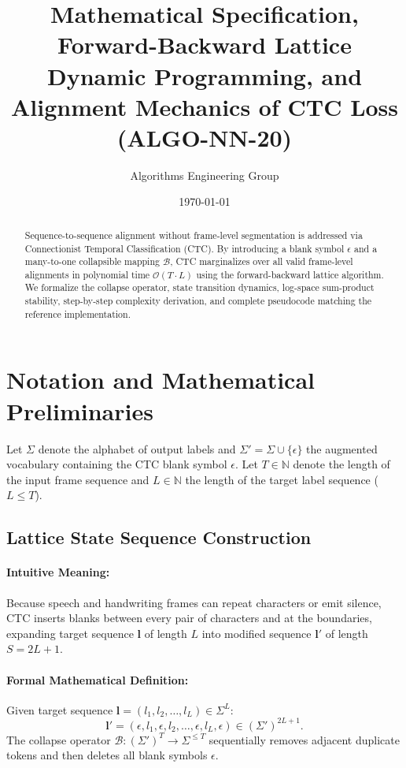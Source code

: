 \documentclass[11pt]{article}
\title{\textbf{Mathematical Specification, Forward-Backward Lattice Dynamic Programming, and Alignment Mechanics of CTC Loss (ALGO-NN-20)}}
\author{Algorithms Engineering Group}
\date{\today}
\begin{document}
\maketitle

\begin{abstract}
Sequence-to-sequence alignment without frame-level segmentation is addressed via Connectionist Temporal Classification (CTC). By introducing a blank symbol $\epsilon$ and a many-to-one collapsible mapping $\mathcal{B}$, CTC marginalizes over all valid frame-level alignments in polynomial time $\mathcal{O}(T \cdot L)$ using the forward-backward lattice algorithm. We formalize the collapse operator, state transition dynamics, log-space sum-product stability, step-by-step complexity derivation, and complete pseudocode matching the reference implementation.
\end{abstract}

\section{Notation and Mathematical Preliminaries}
\label{sec:notation}

Let $\Sigma$ denote the alphabet of output labels and $\Sigma' = \Sigma \cup \{\epsilon\}$ the augmented vocabulary containing the CTC blank symbol $\epsilon$. Let $T \in \mathbb{N}$ denote the length of the input frame sequence and $L \in \mathbb{N}$ the length of the target label sequence ($L \le T$).

\subsection{Lattice State Sequence Construction}
\paragraph{Intuitive Meaning:} Because speech and handwriting frames can repeat characters or emit silence, CTC inserts blanks between every pair of characters and at the boundaries, expanding target sequence $\mathbf{l}$ of length $L$ into modified sequence $\mathbf{l}'$ of length $S = 2L + 1$.

\paragraph{Formal Mathematical Definition:}
Given target sequence $\mathbf{l} = (l_1, l_2, \dots, l_L) \in \Sigma^L$:
\begin{equation}
\label{eq:l_prime_def}
\mathbf{l}' = (\epsilon, l_1, \epsilon, l_2, \dots, \epsilon, l_L, \epsilon) \in (\Sigma')^{2L+1}.
\end{equation}
The collapse operator $\mathcal{B}: (\Sigma')^T \to \Sigma^{\le T}$ sequentially removes adjacent duplicate tokens and then deletes all blank symbols $\epsilon$.
\end{document}
